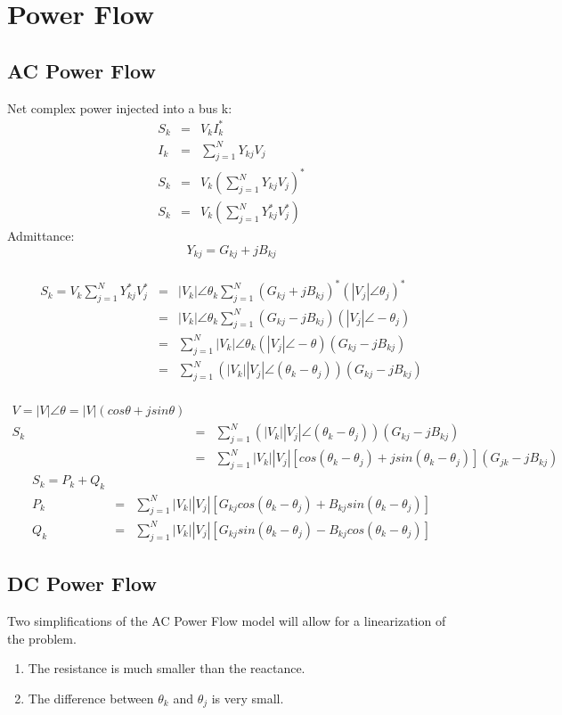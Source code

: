 \chapter{Power Flow}
\section{AC Power Flow}
Net complex power injected into a bus k: \\
\begin{eqnarray} 
S_k &=& V_kI^{*}_{k} \\ 
I_k &=& \sum_{j=1}^N Y_{kj}V_j \nonumber \\
S_k &=& V_k(\sum_{j=1}^NY_{kj}V_j)^* \nonumber\\
S_k &=& V_k ( \sum_{j=1}^NY^*_{kj}V^*_j )
\end{eqnarray}
Admittance: \begin{equation} Y_{kj}=G_{kj}+jB_{kj} \end{equation} \\
\begin{eqnarray}
S_k = V_k \sum_{j=1}^NY^*_{kj}V^*_j &=& |V_k| \angle \theta_k \sum_{j=1}^N (G_{kj} + jB_{kj})^*(|V_j|\angle \theta_j)^* \\
    &=& |V_k| \angle \theta_k \sum_{j=1}^N (G_{kj} - jB_{kj})(|V_j|\angle -\theta_j) \\ 
    &=& \sum_{j=1}^N |V_k| \angle \theta_k (|V_j|\angle-\theta)(G_{kj}-jB_{kj}) \\
    &=& \sum_{j=1}^N (|V_k||V_j|\angle(\theta_k-\theta_j))(G_{kj}-jB_{kj})
\end{eqnarray}\\
\begin{eqnarray}
V=|V|\angle \theta = |V|(cos\theta + jsin\theta) \\
S_k &=& \sum_{j=1}^N(|V_k||V_j|\angle(\theta_k-\theta_j))(G_{kj} - jB_{kj}) \\
    &=& \sum_{j=1}^N|V_k||V_j|[cos(\theta_k-\theta_j) + jsin(\theta_k-\theta_j)](G_{jk} - jB_{kj})
\end{eqnarray}
\begin{eqnarray}
S_k = P_k + Q_k \\
P_k &=& \sum_{j=1}^N|V_k||V_j|[G_{kj}cos(\theta_k-\theta_j)+B_{kj}sin(\theta_k-\theta_j)] \\
Q_k &=& \sum_{j=1}^N|V_k||V_j|[G_{kj}sin(\theta_k-\theta_j)-B_{kj}cos(\theta_k-\theta_j)]
\end{eqnarray}

\section{DC Power Flow}
Two simplifications of the AC Power Flow model will allow for a linearization of the problem.
\begin{enumerate}
\item The resistance is much smaller than the reactance. \label{dc_simp:resistance}
\item The difference between $\theta_k$ and $\theta_j$ is very small. \label{dc_simp:angle}
\end{enumerate}

